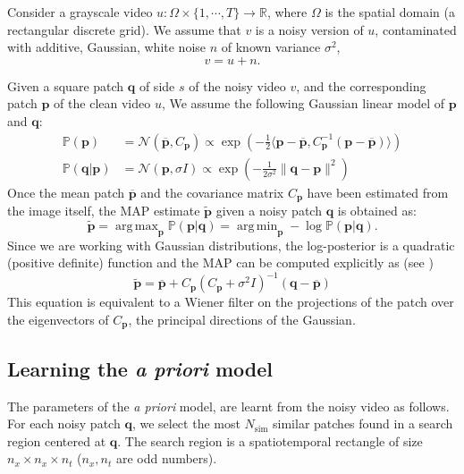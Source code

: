 \documentclass{llncs}
\newcommand{\ma}[1]{\boldsymbol{#1}}
\DeclareMathOperator*{\argmin}{arg\,min}
\DeclareMathOperator*{\argmax}{arg\,max}
\begin{document}
Consider a grayscale video $u:\Omega\times \{1,\cdots,T\}\rightarrow
\mathbb R$, where $\Omega$ is the spatial domain (a rectangular discrete grid).
We assume that $v$ is a noisy version of $u$, contaminated with additive,
Gaussian, white noise $n$ of known variance $\sigma^2$,
\[v = u + n.\]

Given a square patch $\ma q$ of side $s$ of the noisy video $v$, and the 
corresponding patch $\ma p$ of the clean video $u$, We assume the following 
Gaussian linear model of $\ma p$ and $\ma q$:
\begin{align}
	\mathds{P}(\ma p) &= \mathcal N(\overline {\ma p}, C_{\ma p}) \propto \exp\left(-\frac12\langle \ma p - \overline{\ma p}, C_{\ma p}^{-1}(\ma p - \overline{\ma p})\rangle\right) \label{eq:prior}\\
	\mathds{P}(\ma q|\ma p) &= \mathcal N(\ma p, \sigma I) \propto \exp\left(-\frac1{2\sigma^2}\|\ma q - \ma p\|^2\right) \label{eq:obs}
\end{align}
Once the mean patch $\overline{\ma p}$ and the
covariance matrix $C_{\ma p}$ have been estimated from the image itself, the MAP
estimate $\widetilde{\ma p}$ given a noisy patch $\ma q$ is obtained as:
\[ \widetilde{\ma p} = \argmax_{\ma p} \mathds P(\ma p | \ma q) = \argmin_{\ma p} -\log \mathds P(\ma p | \ma q). \]
Since we are working with Gaussian distributions, the log-posterior is a quadratic (positive definite)
function and the MAP can be computed explicitly as (see  \cite{Lebrun2013a})
\begin{equation}
	\widetilde{\ma p} = \overline{\ma p} + C_{\ma p}(C_{\ma p} + \sigma^2 I)^{-1}(\ma q - \overline{\ma p})
	\label{eq:map}
\end{equation}
This equation is equivalent to a Wiener filter on the projections 
of the patch over the eigenvectors of $C_{\ma p}$, the principal directions of
the Gaussian. 
%

\subsection{Learning the \textit{a priori} model}

The parameters of the \textit{a priori} model, are learnt from the noisy video as
follows. For each noisy patch $\ma q$, we select the most $N_{\text{sim}}$
similar patches found in a search region centered at $\ma q$. The
search region is a spatiotemporal rectangle of size $n_x \times
n_x \times n_t$ ($n_x, n_t$ are odd numbers). 
\end{document}
